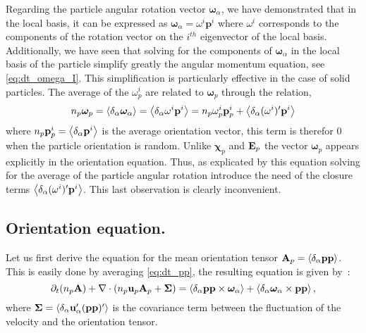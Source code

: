 Regarding the particle angular rotation vector $\bm\omega_\alpha$, we have demonstrated that in the local basis, it can be expressed as $\bm\omega_\alpha  = \omega^i \textbf{p}^i$ where $\omega^i$ corresponds to the components of the rotation vector on the $i^{th}$ eigenvector of the local basis.
Additionally, we have seen that solving for the components of $\bm\omega_\alpha$ in the local basis of the particle simplify greatly the angular momentum equation, see \ref{eq:dt_omega_I}.  
This simplification is particularly effective in the case of solid particles. 
The average of the $\omega^i_p$ are related to $\bm\omega_p$ through the relation, 
\begin{equation*}
    n_p \bm\omega_p
    = \left<\delta_\alpha \bm\omega_\alpha\right>
    =\left<\delta_\alpha \omega^i \textbf{p}^i\right>
    =n_p \omega^i_p   \textbf{p}_p^i
    +\left<\delta_\alpha (\omega^i)' \textbf{p}^i\right>
    \label{eq:omega_p_local}
\end{equation*}
where $n_p \textbf{p}_p^i = \left<\delta_\alpha \textbf{p}^i\right>$ is the average orientation vector, this term is therefor $0$ when the particle orientation is random.  
Unlike $\bm\chi_p$ and $\textbf E_p$ the vector $\bm\omega_p$ appears explicitly in the orientation equation. 
Thus, as explicated by this equation solving for the average of the particle angular rotation introduce the need of the closure terms $\left<\delta_\alpha (\omega^i)' \textbf{p}^i\right>$.
This last observation is clearly inconvenient.

\subsection{Orientation equation.}

Let us first derive the equation for the mean orientation tensor $\textbf{A}_p = \left<\delta_\alpha \textbf{pp}\right>$. 
This is easily done by averaging \ref{eq:dt_pp}, the resulting equation is given by~:
\begin{equation}
    \partial_t (n_p\textbf{A})
    + \mathbf{\nabla}\cdot (
        n_p\textbf{u}_p\textbf{A}_p
        + \mathbf{\Sigma}
        )
    =
    \left<\delta_\alpha \textbf{pp} \times \bm\omega_\alpha\right>
    + \left<\delta_\alpha \bm\omega_\alpha \times \textbf{pp}\right>,
    \label{eq:avg_dt_pp_alpha}
\end{equation}
where $\mathbf{\Sigma} = \left<\delta_\alpha \textbf{u}'_\alpha(\textbf{pp})'\right>$ is the covariance term between the fluctuation of the velocity and the orientation tensor.

